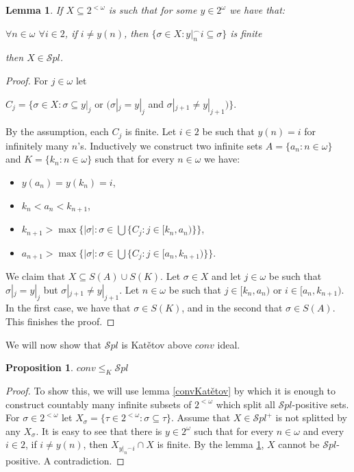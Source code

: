 \documentclass[a4paper]{amsart}
\newtheorem{lemma}[theorem]{Lemma}
\newtheorem{proposition}[theorem]{Proposition}
\newcommand{\Cantor}{2^{\omega}}
\newcommand{\cantor}{2^{<\omega}}
\newcommand{\SPL}{\mathcal{S}pl}
\newcommand{\conv}{conv}
\begin{document}
\begin{lemma}\label{offBranchSpl}
    If $X\subseteq\cantor$ is such that for some $y\in\Cantor$ we have that:
    \begin{center}
        $\forall n\in\omega$ $\forall i\in 2$, if $i\neq y(n)$, then $\{\sigma\in X:y|_{n}^{\frown}i\subseteq\sigma\}$ is finite
    \end{center}
    then $X\in\SPL$.
\end{lemma}
\begin{proof}
    For $j\in\omega$ let 
    \begin{center}
        $C_{j}=\{\sigma\in X: \sigma\subseteq y|_{j}$ or $( \sigma|_{j}=y|_{j}$ and $\sigma|_{j+1}\neq y|_{j+1})\}$.
    \end{center}
    By the assumption, each $C_{j}$ is finite. Let $i\in 2$ be such that $y(n)=i$ for infinitely many $n$'s. Inductively we construct two infinite sets $A=\{a_{n}:n\in\omega\}$ and $K=\{k_{n}:n\in\omega\}$ such that for every $n\in\omega$ we have:
    \begin{itemize}
        \item[--] $y(a_{n})=y(k_{n})=i$,
        \item[--] $k_{n}<a_{n}<k_{n+1}$,
        \item[--] $k_{n+1}>\max\{|\sigma|:\sigma\in\bigcup\{C_{j}:j\in[k_{n},a_{n})\}\}$,
        \item[--] $a_{n+1}>\max\{|\sigma|:\sigma\in\bigcup\{C_{j}:j\in[a_{n},k_{n+1})\}\}$.
    \end{itemize}
    We claim that $X\subseteq S(A)\cup S(K)$. Let $\sigma\in X$ and let $j\in\omega$ be such that $\sigma|_{j}=y|_{j}$ but $\sigma|_{j+1}\neq y|_{j+1}$. Let $n\in\omega$ be such that $j\in[k_{n},a_{n})$ or $i\in[a_{n},k_{n+1})$. In the first case, we have that $\sigma\in S(K)$, and in the second that $\sigma\in S(A)$. This finishes the proof.
\end{proof}
 We will now show that $\SPL$ is Katětov above $\conv$ ideal.
\begin{proposition}\label{SPLconv}
    $\conv\leq_{K}\SPL$
\end{proposition}
\begin{proof}
    To show this, we will use lemma \ref{convKatětov} by which it is enough to construct countably many infinite subsets of $\cantor$ which split all $\SPL$-positive sets. For $\sigma\in\cantor$ let $X_{\sigma}=\{\tau\in\cantor:\sigma\subseteq\tau\}$. Assume that $X\in\SPL^{+}$ is not splitted by any $X_{\sigma}$. It is easy to see that there is $y\in\Cantor$ such that for every $n\in\omega$ and every $i\in 2$, if $i\neq y(n)$, then $X_{y|_{n}\textbf{}^{\frown}i}\cap X$ is finite. By the lemma \ref{offBranchSpl}, $X$ cannot be $\SPL$-positive. A contradiction.
\end{proof}
\end{document}
